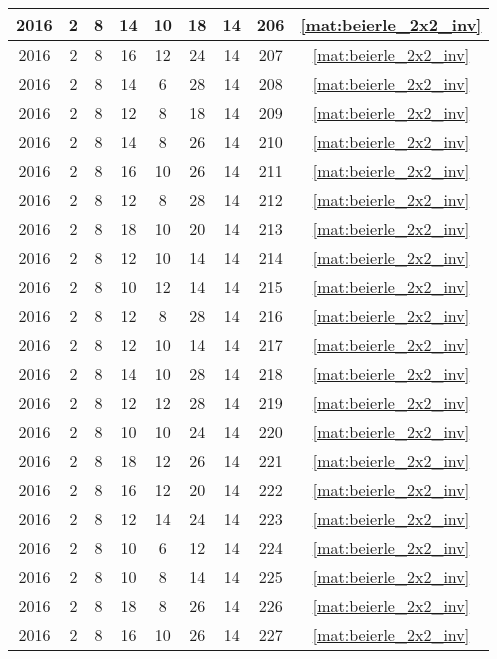 \begin{longtable}{|c|c|c|c|c|c|c|c|c|}
2016 & 2 & 8 & 14 & 10 & 18 & 14 & 206 & \eqref{mat:beierle_2x2_inv} \\ \hline 
2016 & 2 & 8 & 16 & 12 & 24 & 14 & 207 & \eqref{mat:beierle_2x2_inv} \\ \hline 
2016 & 2 & 8 & 14 & 6 & 28 & 14 & 208 & \eqref{mat:beierle_2x2_inv} \\ \hline 
2016 & 2 & 8 & 12 & 8 & 18 & 14 & 209 & \eqref{mat:beierle_2x2_inv} \\ \hline 
2016 & 2 & 8 & 14 & 8 & 26 & 14 & 210 & \eqref{mat:beierle_2x2_inv} \\ \hline 
2016 & 2 & 8 & 16 & 10 & 26 & 14 & 211 & \eqref{mat:beierle_2x2_inv} \\ \hline 
2016 & 2 & 8 & 12 & 8 & 28 & 14 & 212 & \eqref{mat:beierle_2x2_inv} \\ \hline 
2016 & 2 & 8 & 18 & 10 & 20 & 14 & 213 & \eqref{mat:beierle_2x2_inv} \\ \hline 
2016 & 2 & 8 & 12 & 10 & 14 & 14 & 214 & \eqref{mat:beierle_2x2_inv} \\ \hline 
2016 & 2 & 8 & 10 & 12 & 14 & 14 & 215 & \eqref{mat:beierle_2x2_inv} \\ \hline 
2016 & 2 & 8 & 12 & 8 & 28 & 14 & 216 & \eqref{mat:beierle_2x2_inv} \\ \hline 
2016 & 2 & 8 & 12 & 10 & 14 & 14 & 217 & \eqref{mat:beierle_2x2_inv} \\ \hline 
2016 & 2 & 8 & 14 & 10 & 28 & 14 & 218 & \eqref{mat:beierle_2x2_inv} \\ \hline 
2016 & 2 & 8 & 12 & 12 & 28 & 14 & 219 & \eqref{mat:beierle_2x2_inv} \\ \hline 
2016 & 2 & 8 & 10 & 10 & 24 & 14 & 220 & \eqref{mat:beierle_2x2_inv} \\ \hline 
2016 & 2 & 8 & 18 & 12 & 26 & 14 & 221 & \eqref{mat:beierle_2x2_inv} \\ \hline 
2016 & 2 & 8 & 16 & 12 & 20 & 14 & 222 & \eqref{mat:beierle_2x2_inv} \\ \hline 
2016 & 2 & 8 & 12 & 14 & 24 & 14 & 223 & \eqref{mat:beierle_2x2_inv} \\ \hline 
2016 & 2 & 8 & 10 & 6 & 12 & 14 & 224 & \eqref{mat:beierle_2x2_inv} \\ \hline 
2016 & 2 & 8 & 10 & 8 & 14 & 14 & 225 & \eqref{mat:beierle_2x2_inv} \\ \hline 
2016 & 2 & 8 & 18 & 8 & 26 & 14 & 226 & \eqref{mat:beierle_2x2_inv} \\ \hline 
2016 & 2 & 8 & 16 & 10 & 26 & 14 & 227 & \eqref{mat:beierle_2x2_inv} \\ \hline 

\end{longtable}
